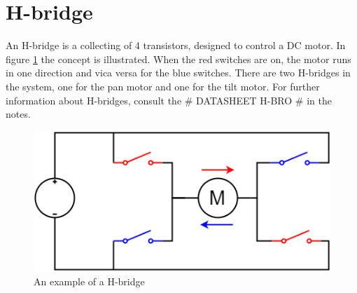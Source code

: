 
\section{H-bridge}

An H-bridge is a collecting of 4 transistors, designed to control a DC motor. In figure \ref{fig:H-bridge} the concept is illustrated. When the red switches are on, the motor runs in one direction and vica versa for the blue switches. There are two H-bridges in the system, one for the pan motor and one for the tilt motor. For further information about H-bridges, consult the \# DATASHEET H-BRO \# in the notes.




\begin{figure}[h!]
\centering
\includegraphics[scale=0.5]{Billeder/H-bridge.png}
\caption{ An example of a H-bridge }
\label{fig:H-bridge}
\end{figure}
